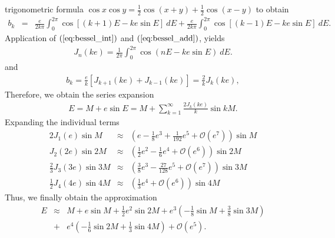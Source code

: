 \documentclass [12pt, a4paper] {article}
\begin{document}
trigonometric formula $\cos x\cos y = \frac{1}{2}\cos(x + y) + \frac{1}{2}\cos(x - y)$ 
to obtain 
\begin {eqnarray}
    b_k 
    &=&
    \frac{e}{2k\pi}\int_0^{2\pi}\cos[(k+1)E - ke\sin E]\:dE
    +
    \frac{e}{2k\pi}\int_0^{2\pi}\cos[(k-1)E - ke\sin E]\:dE.
\end {eqnarray}
Application of $(\ref{eq:bessel_int})$ and $(\ref{eq:bessel_add})$, yields 
\begin {eqnarray}
    J_n(ke) = \frac{1}{2\pi}\int_0^{2\pi}\cos(nE - ke\sin E)\:dE.
\end {eqnarray}
and
\begin {eqnarray}
    b_k = \frac{e}{k}\left[J_{k+1}(ke) + J_{k-1}(ke)\right] = \frac{2}{k}J_k(ke),
\end {eqnarray}
Therefore, we obtain the series expansion 
\begin {eqnarray}
    E = M + e\sin E = M + \sum_{k=1}^\infty \frac{2J_k(ke)}{k}\sin kM.
\end {eqnarray}
Expanding the individual terms 
\begin {eqnarray}
    2J_1(e) \sin M
    &\approx& 
    \left(e - \frac{1}{8}e^3 + \frac{1}{192}e^5 + \mathcal{O}(e^7)\right) \sin M
    \\
    J_2(2e)\sin 2M 
    &\approx& 
    \left(\frac{1}{2}e^2 - \frac{1}{6}e^4 + \mathcal{O}(e^6)\right) \sin 2M
    \\
    \frac{2}{3}
    J_3(3e)\sin 3M 
    &\approx& 
    \left(\frac{3}{8}e^3 - \frac{27}{128}e^5 + \mathcal{O}(e^7)\right) \sin 3M
    \\
    \frac{1}{2}
    J_4(4e)\sin 4M 
    &\approx& 
    \left(\frac{1}{3}e^4 + \mathcal{O}(e^6)\right) \sin 4M
\end {eqnarray}
Thus, we finally obtain the approximation 
\begin {eqnarray}
    E &\approx& M 
    + 
    e\sin M
    +
    \frac{1}{2}
    e^2\sin 2M
    +
    e^3\left(
        -\frac{1}{8}\sin M + \frac{3}{8}\sin 3M
    \right)
    \\\nonumber
    &+& 
    e^4\left(
        -\frac{1}{6}\sin 2M + \frac{1}{3}\sin 4M
    \right)
    + 
    \mathcal{O}(e^5).
\end {eqnarray}
\end{document}
